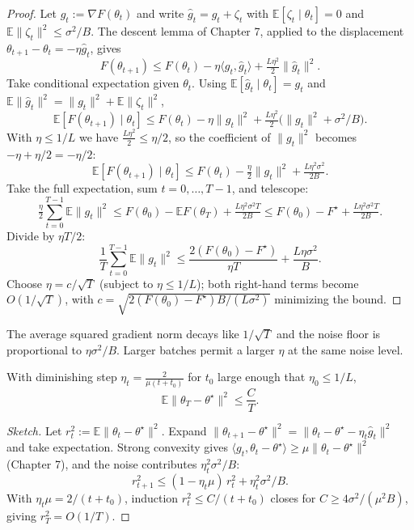 \begin{proof}
Let $g_t := \nabla F(\theta_t)$ and write $\hat g_t = g_t + \zeta_t$ with $\mathbb{E}[\zeta_t \mid \theta_t] = 0$ and $\mathbb{E}\|\zeta_t\|^2 \leq \sigma^2/B$. The descent lemma of Chapter 7, applied to the displacement $\theta_{t+1} - \theta_t = -\eta \hat g_t$, gives
\[
F(\theta_{t+1}) \leq F(\theta_t) - \eta \langle g_t, \hat g_t\rangle + \tfrac{L \eta^2}{2}\|\hat g_t\|^2.
\]
Take conditional expectation given $\theta_t$. Using $\mathbb{E}[\hat g_t \mid \theta_t] = g_t$ and $\mathbb{E}\|\hat g_t\|^2 = \|g_t\|^2 + \mathbb{E}\|\zeta_t\|^2$,
\[
\mathbb{E}[F(\theta_{t+1}) \mid \theta_t] \leq F(\theta_t) - \eta\|g_t\|^2 + \tfrac{L\eta^2}{2}\big(\|g_t\|^2 + \sigma^2/B\big).
\]
With $\eta \leq 1/L$ we have $\tfrac{L\eta^2}{2} \leq \eta/2$, so the coefficient of $\|g_t\|^2$ becomes $-\eta + \eta/2 = -\eta/2$:
\[
\mathbb{E}[F(\theta_{t+1}) \mid \theta_t] \leq F(\theta_t) - \tfrac{\eta}{2}\|g_t\|^2 + \tfrac{L \eta^2 \sigma^2}{2B}.
\]
Take the full expectation, sum $t = 0, \dots, T-1$, and telescope:
\[
\tfrac{\eta}{2} \sum_{t=0}^{T-1} \mathbb{E}\|g_t\|^2 \leq F(\theta_0) - \mathbb{E} F(\theta_T) + \tfrac{L \eta^2 \sigma^2 T}{2B} \leq F(\theta_0) - F^\star + \tfrac{L \eta^2 \sigma^2 T}{2B}.
\]
Divide by $\eta T / 2$:
\[
\frac{1}{T}\sum_{t=0}^{T-1}\mathbb{E}\|g_t\|^2 \leq \frac{2(F(\theta_0) - F^\star)}{\eta T} + \frac{L \eta \sigma^2}{B}.
\]
Choose $\eta = c/\sqrt{T}$ (subject to $\eta \leq 1/L$); both right-hand terms become $O(1/\sqrt{T})$, with $c = \sqrt{2(F(\theta_0) - F^\star) B / (L \sigma^2)}$ minimizing the bound.
\end{proof}

\begin{remark}
The average squared gradient norm decays like $1/\sqrt{T}$ and the noise floor is proportional to $\eta \sigma^2 / B$. Larger batches permit a larger $\eta$ at the same noise level.
\end{remark}

\begin{theorem}
With diminishing step $\eta_t = \tfrac{2}{\mu(t + t_0)}$ for $t_0$ large enough that $\eta_0 \leq 1/L$,
\[
\mathbb{E}\|\theta_T - \theta^\star\|^2 \leq \frac{C}{T}.
\]
\end{theorem}

\begin{proof}[Sketch]
Let $r_t^2 := \mathbb{E}\|\theta_t - \theta^\star\|^2$. Expand $\|\theta_{t+1} - \theta^\star\|^2 = \|\theta_t - \theta^\star - \eta_t \hat g_t\|^2$ and take expectation. Strong convexity gives $\langle g_t, \theta_t - \theta^\star\rangle \geq \mu \|\theta_t - \theta^\star\|^2$ (Chapter 7), and the noise contributes $\eta_t^2 \sigma^2/B$:
\[
r_{t+1}^2 \leq (1 - \eta_t \mu)\, r_t^2 + \eta_t^2 \sigma^2 / B.
\]
With $\eta_t \mu = 2/(t + t_0)$, induction $r_t^2 \leq C/(t + t_0)$ closes for $C \geq 4 \sigma^2/(\mu^2 B)$, giving $r_T^2 = O(1/T)$.
\end{proof}

